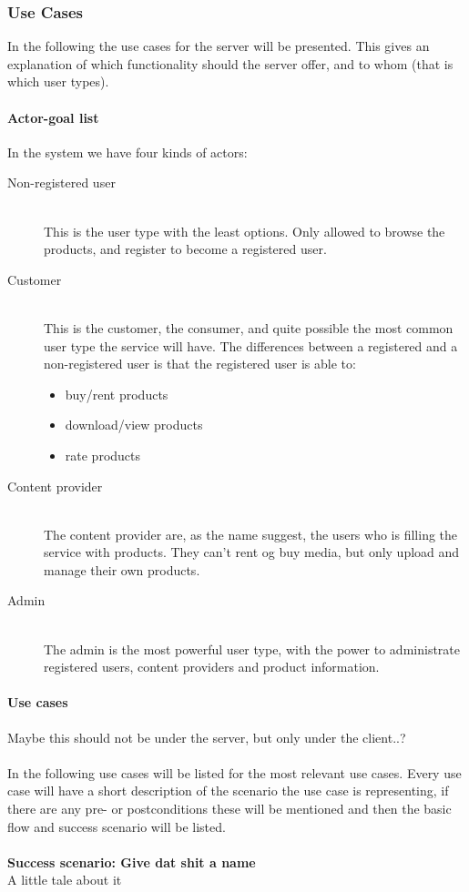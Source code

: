 \subsubsection{Use Cases}
In the following the use cases for the server will be presented. This gives an explanation of which functionality should the server offer, and to whom (that is which user types).
\paragraph{Actor-goal list}
\label{s_actor-goal-list}
In the system we have four kinds of actors:
\begin{description}
	\item [Non-registered user] \hfill \\
		This is the user type with the least options. Only allowed to browse the products, and register to become a registered user.
	\item [Customer]  \hfill \\
		This is the customer, the consumer, and quite possible the most common user type the service will have. The differences between a registered and a non-registered user is that the registered user is able to:
		\begin{itemize}
			\item buy/rent products
			\item download/view products
			\item rate products
		\end{itemize}
	\item [Content provider] \hfill \\
		The content provider are, as the name suggest, the users who is filling the service with products. They can't rent og buy media, but only upload and manage their own products.
	\item [Admin] \hfill \\
		The admin is the most powerful user type, with the power to administrate registered users, content providers and product information.
\end{description}

\paragraph{Use cases}

Maybe this should not be under the server, but only under the client..?\\\\
In the following use cases will be listed for the most relevant use cases. Every use case will have a short description of the scenario the use case is representing, if there are any pre- or postconditions these will be mentioned and then the basic flow and success scenario will be listed.
\\\\
\textbf{Success scenario: Give dat shit a name} \\
A little tale about it

